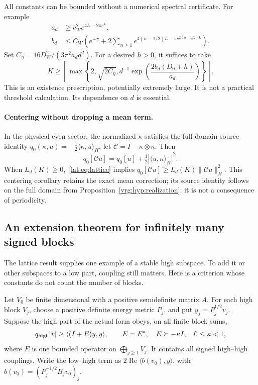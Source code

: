 \documentclass[11pt,a4paper]{article}
\numberwithin{equation}{section}
\theoremstyle{definition}\newtheorem{definition}[theorem]{Definition}
\theoremstyle{remark}\newtheorem{remark}[theorem]{Remark}
\newcommand{\ip}[2]{\langle#1,#2\rangle}\newcommand{\norm}[1]{\lVert#1\rVert}\newcommand{\abs}[1]{\lvert#1\rvert}
\begin{document}
All constants can be bounded without a numerical spectral certificate.
For example
\begin{align*}
 a_d&\ge c_W^2e^{4L-2\pi e^L},\\
 b_d&\le C_W\left(e^{-\pi}+2\sum_{n\ge1}
       e^{4(n-1/2)L-\pi e^{2(n-1/2)L}}\right).
\end{align*}
Set $C_\eta=16D_W^2/(3\pi^2a_dd^2)$. For a desired $h>0$, it suffices to take
\[
 K\ge\left\lceil\max\left\{2,\sqrt{2C_\eta},
 d^{-1}\exp\!\left(\frac{2b_d(D_0+h)}{a_d}\right)\right\}\right\rceil.
\]
This is an existence prescription, potentially extremely large. It is
not a practical threshold calculation. Its dependence on $d$ is essential.

\paragraph{Centering without dropping a mean term.}
In the physical even sector, the normalized $\kappa$ satisfies the full-domain source
identity $q_0(\kappa,u)=-\frac12\ip\kappa u_H$, let
$\mathcal C=I-\kappa\otimes\kappa$. Then
\[
 q_0[\mathcal Cu]=q_0[u]+\tfrac12|\ip u\kappa_H|^2.
\]
When $L_d(K)\ge0$,~\eqref{lat:eq:lattice} implies
$q_0[\mathcal Cu]\ge L_d(K)\norm{\mathcal Cu}_H^2$.
This centering corollary retains the exact mean correction; its source
identity follows on the full domain from Proposition~\ref{vrg:hyp:realization}; it is not a consequence of periodicity.

\subsection{An extension theorem for infinitely many signed blocks}
The lattice result supplies one example of a stable high subspace.
To add it or other subspaces to a low part, coupling still matters.
Here is a criterion whose constants do not count the number of blocks.

Let $V_0$ be finite dimensional with a positive semidefinite matrix $A$.
For each high block $V_j$, choose a positive definite energy metric $P_j$,
and put $y_j=P_j^{1/2}v_j$. Suppose the high part of the actual form
obeys, on all finite block sums,
\[
 q_{\rm high}[v]\ge\ip{(I+E)y}{y},\qquad
 E=E^*,\quad E\succeq-\kappa I,\quad0\le\kappa<1,
\]
where $E$ is one bounded operator on $\bigoplus_{j\ge1}V_j$.
It contains all signed high--high couplings. Write the low--high term as
$2\operatorname{Re}\ip{b(v_0)}y$, with
$b(v_0)=(P_j^{-1/2}B_jv_0)_j$.
\end{document}

